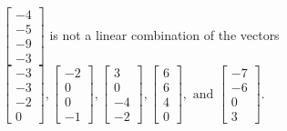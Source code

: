 \begin{exercise}
\begin{exerciseStatement}
  \end{exerciseStatement}
  \begin{exerciseAnswer}
   \(\left[\begin{array}{c}
-4 \\
-5 \\
-9 \\
-3
\end{array}\right]\) 
  	 is not  
	a linear combination of the vectors \(\left[\begin{array}{c}
-3 \\
-3 \\
-2 \\
0
\end{array}\right] , \left[\begin{array}{c}
-2 \\
0 \\
0 \\
-1
\end{array}\right] , \left[\begin{array}{c}
3 \\
0 \\
-4 \\
-2
\end{array}\right] , \left[\begin{array}{c}
6 \\
6 \\
4 \\
0
\end{array}\right] , \text{ and } \left[\begin{array}{c}
-7 \\
-6 \\
0 \\
3
\end{array}\right]\).

	
  


  \end{exerciseAnswer}
\end{exercise}